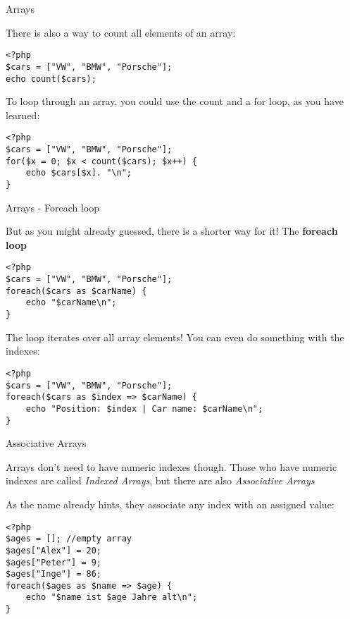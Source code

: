 \begin{frame}[fragile]{Arrays}

There is also a way to count all elements of an array: \pause

\begin{lstlisting}
<?php
$cars = ["VW", "BMW", "Porsche"];
echo count($cars);
\end{lstlisting} \pause

To loop through an array, you could use the count and a for loop, as you have learned: \pause

\begin{lstlisting}
<?php
$cars = ["VW", "BMW", "Porsche"];
for($x = 0; $x < count($cars); $x++) {
    echo $cars[$x]. "\n";
}
\end{lstlisting} \pause

\end{frame}

\begin{frame}[fragile]{Arrays - Foreach loop}

But as you might already guessed, there is a shorter way for it! The \textbf{foreach loop} \pause

\begin{lstlisting}
<?php
$cars = ["VW", "BMW", "Porsche"];
foreach($cars as $carName) {
    echo "$carName\n";
}
\end{lstlisting} \pause

The loop iterates over all array elements! You can even do something with the indexes: \pause

\begin{lstlisting}
<?php
$cars = ["VW", "BMW", "Porsche"];
foreach($cars as $index => $carName) {
    echo "Position: $index | Car name: $carName\n";
}
\end{lstlisting} \pause

\end{frame}

\begin{frame}[fragile]{Associative Arrays}

Arrays don't need to have numeric indexes though. Those who have numeric indexes are called \emph{Indexed Arrays}, but there are also \emph{Associative Arrays}\pause

As the name already hints, they associate any index with an assigned value:
\begin{lstlisting}
<?php
$ages = []; //empty array
$ages["Alex"] = 20;
$ages["Peter"] = 9;
$ages["Inge"] = 86;
foreach($ages as $name => $age) {
    echo "$name ist $age Jahre alt\n";
}
\end{lstlisting} \pause

\end{frame}

